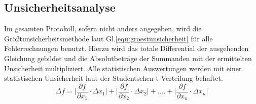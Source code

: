 \subsection{Unsicherheitsanalyse}
\label{sec:unsichi}
Im gesamten Protokoll, sofern nicht anders angegeben, wird die Größtunsicherheitsmethode laut Gl.\ref{equ:groestunsicherheit} \cite{MMETH} für alle Fehlerrechnungen benutzt.
Hierzu wird das totale Differential der ausgehenden Gleichung gebildet und die Absolutbeträge der Summanden mit der ermittelten Unsicherheit multipliziert.
Alle statistischen Auswertungen werden mit einer statistischen Unsicherheit laut der Studentschen t-Verteilung behaftet.
\begin{equation}
    \varDelta f = \biggl| \frac{\partial f}{\partial x_{1}} \cdot \varDelta x_{1} \biggl| + \biggl| \frac{\partial f}{\partial x_{2}} \cdot \varDelta x_{2} \biggl| + .... + \biggl| \frac{\partial f}{\partial x_{n}} \cdot \varDelta x_{n} \biggl|
    \label{equ:groestunsicherheit}
\end{equation}
\newpage